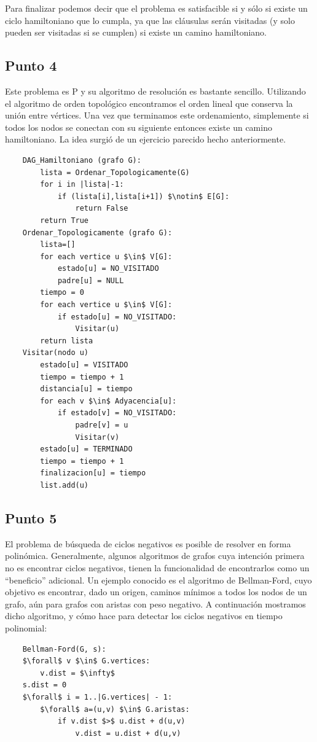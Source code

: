 \documentclass[a4paper,10pt]{article}
\begin{document}
	Para finalizar podemos decir que el problema es satisfacible si y sólo si existe un ciclo hamiltoniano que lo cumpla, ya que las cláusulas serán visitadas (y solo pueden ser visitadas si se cumplen) si existe un camino hamiltoniano.

\subsection{Punto 4}
	Este problema es P y su algoritmo de resolución es bastante sencillo. Utilizando el algoritmo de orden topológico encontramos el orden lineal que conserva la unión entre vértices. Una vez que terminamos este ordenamiento, simplemente si todos los nodos se conectan con su siguiente entonces existe un camino hamiltoniano. La idea surgió de un ejercicio parecido hecho anteriormente.
	\begin{lstlisting}
	DAG_Hamiltoniano (grafo G):
	    lista = Ordenar_Topologicamente(G)
	    for i in |lista|-1:
	        if (lista[i],lista[i+1]) $\notin$ E[G]:
	            return False
	    return True
	Ordenar_Topologicamente (grafo G):
	    lista=[]
	    for each vertice u $\in$ V[G]:
	        estado[u] = NO_VISITADO
	        padre[u] = NULL
	    tiempo = 0
	    for each vertice u $\in$ V[G]:
	        if estado[u] = NO_VISITADO:
	            Visitar(u)
	    return lista
	Visitar(nodo u)
	    estado[u] = VISITADO
	    tiempo = tiempo + 1
	    distancia[u] = tiempo
	    for each v $\in$ Adyacencia[u]:
	        if estado[v] = NO_VISITADO:
	            padre[v] = u
	            Visitar(v)
	    estado[u] = TERMINADO
	    tiempo = tiempo + 1
	    finalizacion[u] = tiempo
	    list.add(u)
	\end{lstlisting}

\subsection{Punto 5}
	El problema de búsqueda de ciclos negativos es posible de resolver en forma polinómica. Generalmente, algunos algoritmos de grafos cuya intención primera no es encontrar ciclos negativos, tienen la funcionalidad de encontrarlos como un ``beneficio'' adicional. Un ejemplo conocido es el algoritmo de Bellman-Ford, cuyo objetivo es encontrar, dado un origen, caminos mínimos a todos los nodos de un grafo, aún para grafos con aristas con peso negativo. A continuación mostramos dicho algoritmo, y cómo hace para detectar los ciclos negativos en tiempo polinomial:
	\begin{lstlisting}
	Bellman-Ford(G, s):
	$\forall$ v $\in$ G.vertices:
	    v.dist = $\infty$
	s.dist = 0
	$\forall$ i = 1..|G.vertices| - 1:
	    $\forall$ a=(u,v) $\in$ G.aristas:
	        if v.dist $>$ u.dist + d(u,v)
	            v.dist = u.dist + d(u,v)
	\end{lstlisting}
\end{document}

